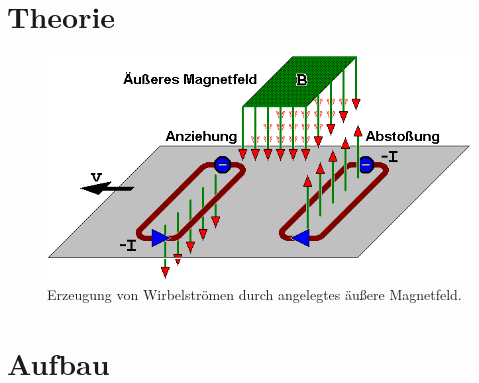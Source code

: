 \section{Theorie}

\begin{frame}
  \begin{figure}
    \centering
    \includegraphics[width = \textwidth]{Lorentzkraft.png}
    \caption{Erzeugung von Wirbelströmen durch angelegtes äußere Magnetfeld. \cite{Lorentzkraft}}
  \end{figure}
\end{frame}

\section{Aufbau}

